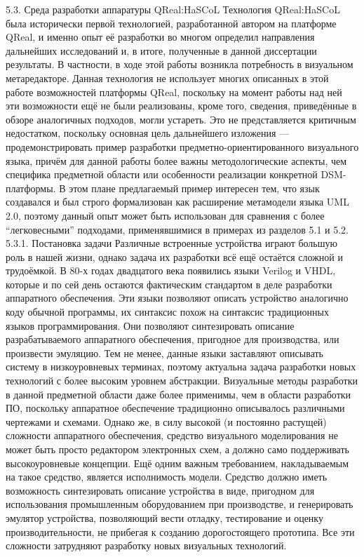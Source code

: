 5.3. Среда разработки аппаратуры QReal:HaSCoL
	Технология QReal:HaSCoL была исторически первой технологией, разработанной автором на платформе QReal, и именно опыт её разработки во многом определил направления дальнейших исследований и, в итоге, полученные в данной диссертации результаты. В частности, в ходе этой работы возникла потребность в визуальном метаредакторе. Данная технология не использует многих описанных в этой работе возможностей платформы QReal, поскольку на момент работы над ней эти возможности ещё не были реализованы, кроме того, сведения, приведённые в обзоре аналогичных подходов, могли устареть. Это не представляется критичным недостатком, поскольку основная цель дальнейшего изложения --- продемонстрировать пример разработки предметно-ориентированного визуального языка, причём для данной работы более важны методологические аспекты, чем специфика предметной области или особенности реализации конкретной DSM-платформы. В этом плане предлагаемый пример интересен тем, что язык создавался и был строго формализован как расширение метамодели языка UML 2.0, поэтому данный опыт может быть использован для сравнения с более “легковесными” подходами, применявшимися в примерах из разделов 5.1 и 5.2.
5.3.1. Постановка задачи
	Различные встроенные устройства играют большую роль в нашей жизни, однако задача их разработки всё ещё остаётся сложной и трудоёмкой.  В 80-х годах двадцатого века появились языки Verilog и VHDL, которые и по сей день остаются фактическим стандартом в деле разработки аппаратного обеспечения. Эти языки позволяют описать устройство аналогично коду обычной программы, их синтаксис похож на синтаксис традиционных языков программирования. Они позволяют синтезировать описание разрабатываемого аппаратного обеспечения, пригодное для производства, или произвести эмуляцию.
Тем не менее, данные языки заставляют описывать систему в низкоуровневых терминах, поэтому актуальна задача разработки новых технологий с более высоким уровнем абстракции. Визуальные методы разработки в данной предметной области даже более применимы, чем в области разработки ПО, поскольку аппаратное обеспечение традиционно описывалось различными чертежами и схемами. Однако же, в силу высокой (и постоянно растущей) сложности аппаратного обеспечения, средство визуального моделирования не может быть просто редактором электронных схем, а должно само поддерживать высокоуровневые концепции. Ещё одним важным требованием, накладываемым на такое средство, является исполнимость модели. Средство должно иметь возможность синтезировать описание устройства в виде, пригодном для использования промышленным оборудованием при производстве, и генерировать эмулятор устройства, позволяющий вести отладку, тестирование и оценку производительности, не прибегая к созданию дорогостоящего прототипа. Все эти сложности затрудняют разработку новых визуальных технологий.
